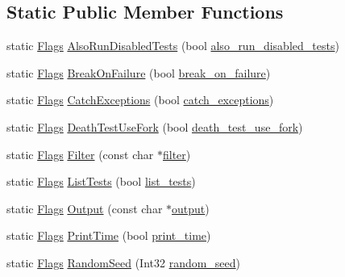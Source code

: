 \subsection*{Static Public Member Functions}
\begin{DoxyCompactItemize}
\item 
static \hyperlink{structtesting_1_1Flags}{Flags} \hyperlink{structtesting_1_1Flags_a8bee2b5f94d8248b6791d6b005db146f}{Also\+Run\+Disabled\+Tests} (bool \hyperlink{structtesting_1_1Flags_a8ebf8c68f918b9039926b569c880f910}{also\+\_\+run\+\_\+disabled\+\_\+tests})
\item 
static \hyperlink{structtesting_1_1Flags}{Flags} \hyperlink{structtesting_1_1Flags_a62660e44922321f7640bc951a04c2296}{Break\+On\+Failure} (bool \hyperlink{structtesting_1_1Flags_acccce2a9673bb61751269d2ef9c21c89}{break\+\_\+on\+\_\+failure})
\item 
static \hyperlink{structtesting_1_1Flags}{Flags} \hyperlink{structtesting_1_1Flags_a2c7d89f62f4328ae0ced66154ef96b44}{Catch\+Exceptions} (bool \hyperlink{structtesting_1_1Flags_a06984d0553f09716e1bd9f159e7cc644}{catch\+\_\+exceptions})
\item 
static \hyperlink{structtesting_1_1Flags}{Flags} \hyperlink{structtesting_1_1Flags_a4468e5625833043596c44be174349d8c}{Death\+Test\+Use\+Fork} (bool \hyperlink{structtesting_1_1Flags_a7cdef4e6e102771fc15940931dd07e5c}{death\+\_\+test\+\_\+use\+\_\+fork})
\item 
static \hyperlink{structtesting_1_1Flags}{Flags} \hyperlink{structtesting_1_1Flags_afc7350b7c1ac4c0e0efe2d9a94729eb7}{Filter} (const char $\ast$\hyperlink{structtesting_1_1Flags_aa52c1048a7e3cbe726ed4160f2e05d14}{filter})
\item 
static \hyperlink{structtesting_1_1Flags}{Flags} \hyperlink{structtesting_1_1Flags_a825a5d763a31fe6c28f543990bd336df}{List\+Tests} (bool \hyperlink{structtesting_1_1Flags_a3c73f29131074146224018066379fb2f}{list\+\_\+tests})
\item 
static \hyperlink{structtesting_1_1Flags}{Flags} \hyperlink{structtesting_1_1Flags_a507916734a6d7ff2dd02891d7849f2d3}{Output} (const char $\ast$\hyperlink{structtesting_1_1Flags_a8c8289b3af9310744bc25280e3980e4b}{output})
\item 
static \hyperlink{structtesting_1_1Flags}{Flags} \hyperlink{structtesting_1_1Flags_af4dc8454995fb3691399a049e95de179}{Print\+Time} (bool \hyperlink{structtesting_1_1Flags_a8758d574ce5513402679df258f788733}{print\+\_\+time})
\item 
static \hyperlink{structtesting_1_1Flags}{Flags} \hyperlink{structtesting_1_1Flags_a695cd8b8ab44df5eaa371bacded78c05}{Random\+Seed} (Int32 \hyperlink{structtesting_1_1Flags_a4728bce63433f711205fd7b427e57f1b}{random\+\_\+seed})

\end{DoxyCompactItemize}
